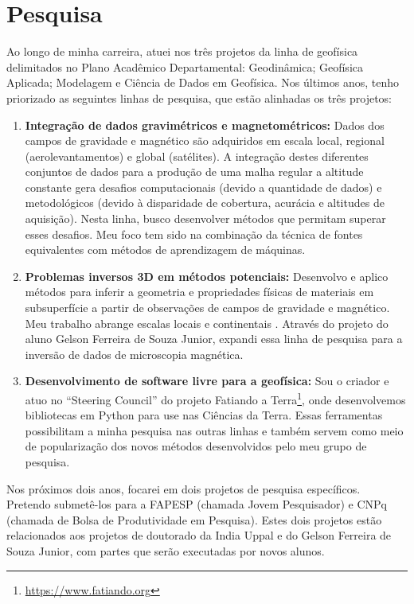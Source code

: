 \documentclass[12pt,a4paper,oneside]{book}
\begin{document}
\chapter{Pesquisa}

Ao longo de minha carreira, atuei nos três projetos da linha de geofísica
delimitados no Plano Acadêmico Departamental: Geodinâmica; Geofísica Aplicada;
Modelagem e Ciência de Dados em Geofísica.
Nos últimos anos, tenho priorizado as seguintes linhas de pesquisa, que  estão
alinhadas os três projetos:

\begin{enumerate}
  \item \textbf{Integração de dados gravimétricos e magnetométricos:}
    Dados dos campos de gravidade e magnético são adquiridos em escala local,
    regional (aerolevantamentos) e global (satélites). A integração destes
    diferentes conjuntos de dados para a produção de uma malha regular a
    altitude constante gera desafios computacionais (devido a quantidade de dados) e metodológicos (devido à disparidade de cobertura, acurácia e altitudes
    de aquisição). Nesta linha, busco desenvolver métodos que permitam superar
    esses desafios. Meu foco tem sido na combinação da técnica de fontes
    equivalentes com métodos de aprendizagem de máquinas.
  \item \textbf{Problemas inversos 3D em métodos potenciais:}
    Desenvolvo e aplico métodos para inferir a geometria e propriedades físicas
    de materiais em subsuperfície a partir de observações de campos de
    gravidade e magnético. Meu trabalho abrange escalas locais
    \citep{Uieda2012,Carlos2014} e continentais \citep{Uieda2017,Zhao2019}.
    Através do projeto do aluno Gelson Ferreira de Souza Junior, expandi essa
    linha de pesquisa para a inversão de dados de microscopia magnética.
  \item \textbf{Desenvolvimento de software livre para a geofísica:}
    Sou o criador e atuo no ``Steering Council'' do projeto Fatiando a
    Terra\footnote{\url{https://www.fatiando.org}}, onde desenvolvemos
    bibliotecas em Python para use nas Ciências da Terra. Essas ferramentas
    possibilitam a minha pesquisa nas outras linhas e também servem como meio
    de popularização dos novos métodos desenvolvidos pelo meu grupo de
    pesquisa.
\end{enumerate}

Nos próximos dois anos, focarei em dois projetos de pesquisa específicos.
Pretendo submetê-los para a FAPESP (chamada Jovem Pesquisador) e CNPq (chamada
de Bolsa de Produtividade em Pesquisa). Estes dois projetos estão relacionados
aos projetos de doutorado da India Uppal e do Gelson Ferreira de Souza Junior,
com partes que serão executadas por novos alunos.
\end{document}

